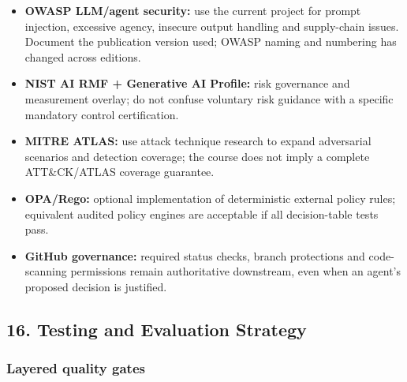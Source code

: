 \documentclass[
  10pt,
]{article}
\providecommand{\tightlist}{%
  \setlength{\itemsep}{0pt}\setlength{\parskip}{0pt}}
\begin{document}
\begin{itemize}
\tightlist
\item
  \textbf{OWASP LLM/agent security:} use the current project for prompt
  injection, excessive agency, insecure output handling and supply-chain
  issues. Document the publication version used; OWASP naming and
  numbering has changed across editions.
\item
  \textbf{NIST AI RMF + Generative AI Profile:} risk governance and
  measurement overlay; do not confuse voluntary risk guidance with a
  specific mandatory control certification.
\item
  \textbf{MITRE ATLAS:} use attack technique research to expand
  adversarial scenarios and detection coverage; the course does not
  imply a complete ATT\&CK/ATLAS coverage guarantee.
\item
  \textbf{OPA/Rego:} optional implementation of deterministic external
  policy rules; equivalent audited policy engines are acceptable if all
  decision-table tests pass.
\item
  \textbf{GitHub governance:} required status checks, branch protections
  and code-scanning permissions remain authoritative downstream, even
  when an agent's proposed decision is justified.
\end{itemize}

\subsection{16. Testing and Evaluation
Strategy}\label{testing-and-evaluation-strategy}

\subsubsection{Layered quality gates}\label{layered-quality-gates}
\end{document}
